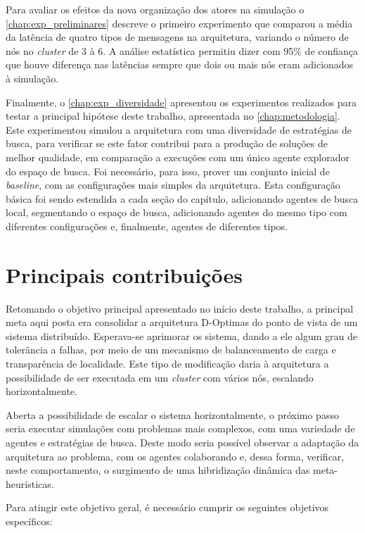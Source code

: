 Para avaliar os efeitos da nova organização dos atores na simulação o \autoref{chap:exp_preliminares} descreve o primeiro experimento  que comparou a média da latência de quatro tipos de mensagens na arquitetura, variando o número de nós no \textit{cluster}  de 3 à 6. A análise estatística permitiu dizer com 95\% de confiança que houve diferença nas latências sempre que dois ou mais nós eram adicionados à simulação. 

Finalmente, o \autoref{chap:exp_diversidade} apresentou os experimentos realizados para testar a principal hipótese deste trabalho, apresentada no \autoref{chap:metodologia}. Este experimentou simulou a arquitetura com uma diversidade de estratégias de busca, para verificar se este fator contribui para a produção de soluções de melhor qualidade, em comparação a execuções com um único agente explorador do espaço de busca. Foi necessário, para isso, prover um conjunto inicial de \textit{baseline}, com as configurações mais simples da arquitetura. Esta configuração básica foi sendo estendida a cada seção do capítulo, adicionando agentes de busca local, segmentando o espaço de busca, adicionando agentes do mesmo tipo com diferentes configurações e, finalmente, agentes de diferentes tipos.   

\section{Principais contribuições}

Retomando o objetivo principal apresentado no início deste trabalho, a principal meta aqui posta era consolidar a arquitetura D-Optimas do ponto de vista de um sistema distribuído. Esperava-se aprimorar os sistema, dando a ele algum grau de tolerância a falhas, por meio de um mecanismo de balanceamento de carga e transparência de localidade. Este tipo de modificação daria à arquitetura a possibilidade de ser executada em um \textit{cluster} com vários nós, escalando horizontalmente. 

Aberta a possibilidade de escalar o sistema horizontalmente, o próximo passo seria executar simulações com problemas mais complexos, com uma variedade de agentes e estratégias de busca. Deste modo seria possível observar a adaptação da arquitetura ao problema, com os agentes colaborando e, dessa forma, verificar, neste comportamento,  o surgimento de uma hibridização dinâmica das meta-heurísticas.



Para atingir este objetivo geral, é necessário cumprir os seguintes objetivos específicos: 

